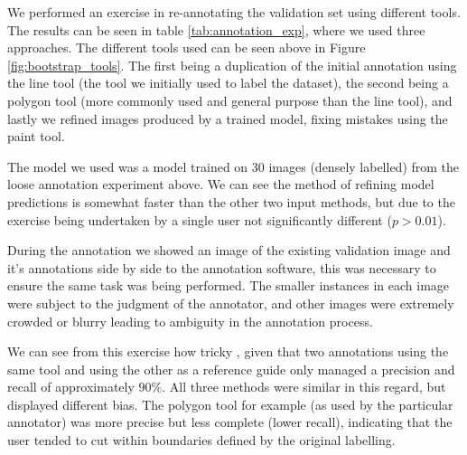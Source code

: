 We performed an exercise in re-annotating the validation set using different tools. The results can be seen in table \ref{tab:annotation_exp}, where we used three approaches. The different tools used can be seen above in Figure \ref{fig:bootstrap_tools}.  The first being a duplication of the initial annotation using the line tool (the tool we initially used to label the dataset), the second being a polygon tool (more commonly used and general purpose than the line tool), and lastly we refined images produced by a trained model, fixing mistakes using the paint tool.

The model we used was a model trained on 30 images (densely labelled) from the loose annotation experiment above. We can see the method of refining model predictions is somewhat faster than the other two input methods, but due to the exercise being undertaken by a single user not significantly different ($ p > 0.01 $).

During the annotation we showed an image of the existing validation image and it's annotations side by side to the annotation software, this was necessary to ensure the same task was being performed. The smaller instances in each image were subject to the judgment of the annotator, and other images were extremely crowded or blurry leading to ambiguity in the annotation process. 



We can see from this exercise how tricky , given that two annotations using the same tool and using the other as a reference guide only managed a precision and recall of approximately $ 90\% $. All three methods were similar in this regard, but displayed different bias. The polygon tool for example (as used by the particular annotator) was more precise but less complete (lower recall), indicating that the user tended to cut within boundaries defined by the original labelling. 




\begin{table*}[!ht]
  \centering
    \caption{Statistics from annotating validation set in different ways. Precision, recall and IOU are a comparison with the original validation set. Note figures in brackets are the original statistics of the un-modified predictions from the model}

\noindent{}

\label{tab:annotation_exp}
\end{table*}


